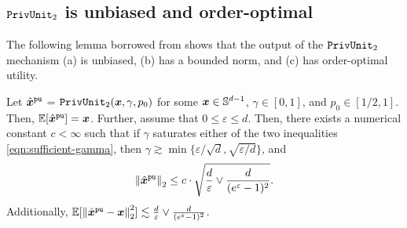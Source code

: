 \subsection{\texorpdfstring{$\texttt{PrivUnit}_2$}{PrivUnit} is unbiased and order-optimal}
The following lemma borrowed from \cite{BDFKR2018} shows that the output of the $\texttt{PrivUnit}_2$ mechanism  (a) is unbiased, (b) has a bounded norm, and (c) has order-optimal utility.

\begin{proposition}
 Let $\hat{{\boldsymbol{x}}}^{\texttt{pu}}$ = \emph{$\texttt{PrivUnit}_2({\boldsymbol{x}},\gamma, p_0)$} for some ${\boldsymbol{x}} \in \mathbb{S}^{d-1}$, $\gamma
  \in [0,1]$, and $p_0 \in [1/2, 1]$. Then, $\mathbb{E}[\hat{{\boldsymbol{x}}}^{\texttt{pu}}] = {\boldsymbol{x}}$. Further, assume that $0 \le \varepsilon \le d$. Then, there exists a numerical constant $c < \infty$ such that if
  $\gamma$ saturates either of the two inequalities
  \eqref{eqn:sufficient-gamma}, then $\gamma \gtrsim \min\{\varepsilon / \sqrt{d},
  \sqrt{\varepsilon / d}\}$, and 
  \begin{equation*}
    \left\|{\hat{{\boldsymbol{x}}}^{\texttt{pu}}}\right\|_2
    \le c \cdot \sqrt{\frac{d}{\varepsilon} \vee
      \frac{d}{(e^\varepsilon - 1)^2}}.
  \end{equation*}
  Additionally, $\mathbb{E}[\left\|{\hat{{\boldsymbol{x}}}^{\texttt{pu}} - {\boldsymbol{x}}}\right\|_2^2] \lesssim
  \frac{d}{\varepsilon} \vee \frac{d}{(e^\varepsilon - 1)^2}$.
 \label{proposition:ltwo-utility}
\end{proposition}



